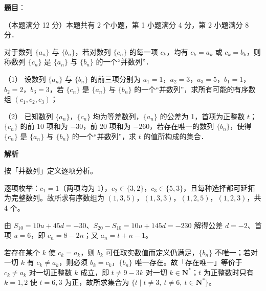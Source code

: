 \begin{answer}

\textbf{题目}：

（本题满分 12 分）本题共有 2 个小题，第 1 小题满分 4 分，第 2 小题满分 8 分．

对于数列 \(\{a_{n}\}\) 与 \(\{b_{n}\}\)，若对数列 \(\{c_{n}\}\) 的每一项 \(c_{k}\)，均有 \(c_{k}=a_{k}\) 或 \(c_{k}=b_{k}\)，则称数列 \(\{c_{n}\}\) 是 \(\{a_{n}\}\) 与 \(\{b_{n}\}\) 的一个“并数列”．

（1） 设数列 \(\{a_{n}\}\) 与 \(\{b_{n}\}\) 的前三项分别为 \(a_{1}=1\)，\(a_{2}=3\)，\(a_{3}=5\)，\(b_{1}=1\)，\(b_{2}=2\)，\(b_{3}=3\)，若 \(\{c_{n}\}\) 是 \(\{a_{n}\}\) 与 \(\{b_{n}\}\) 的一个“并数列”，求所有可能的有序数组 \((c_{1},c_{2},c_{3})\)；

（2） 已知数列 \(\{a_{n}\}\)，\(\{c_{n}\}\) 均为等差数列，\(\{a_{n}\}\) 的公差为 1，首项为正整数 \(t\)；\(\{c_{n}\}\) 的前 10 项和为 \(-30\)，前 20 项和为 \(-260\)，若存在唯一的数列 \(\{b_{n}\}\)，使得 \(\{c_{n}\}\) 是 \(\{a_{n}\}\) 与 \(\{b_{n}\}\) 的一个“并数列”，求 \(t\) 的值所构成的集合．

\textbf{解析}

按「并数列」定义逐项分析。


逐项枚举：\(c_{1}=1\)（两项均为 1），\(c_{2}\in\{3,2\}\)，\(c_{3}\in\{5,3\}\)，且每种选择都可延拓为完整数列。故所求有序数组为 \((1,3,5)\)，\((1,3,3)\)，\((1,2,5)\)，\((1,2,3)\)，共 4 个。


由 \(S_{10}=10u+45d=-30\)、\(S_{20}-S_{10}=10u+145d=-230\) 解得公差 \(d=-2\)、首项 \(u=6\)，即 \(c_{n}=8-2n\)；又 \(a_{n}=t+n-1\)。

若存在某个 \(k\) 使 \(c_{k}=a_{k}\)，则 \(b_{k}\) 可任取实数值而定义仍满足，\(\{b_{n}\}\) 不唯一；若对一切 \(k\) 有 \(c_{k}\neq a_{k}\)，则必须 \(b_{k}=c_{k}\)，\(\{b_{n}\}\) 唯一存在。故「存在唯一」等价于 \(c_{k}\neq a_{k}\) 对一切正整数 \(k\) 成立，即 \(t\neq 9-3k\) 对一切 \(k\in\mathbf{N}^{*}\)；\(t\) 为正整数时只有 \(k=1,2\) 使 \(t=6,3\) 为正，故所求集合为 \(\{t\mid t\neq 3,\ t\neq 6,\ t\in\mathbf{N}^{*}\}\)。



\end{answer}